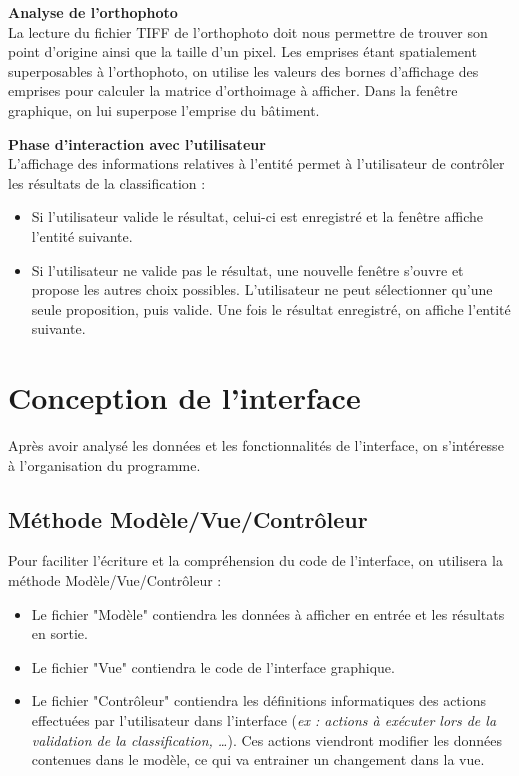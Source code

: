 \noindent\textbf{Analyse de l'orthophoto}\\

La lecture du fichier TIFF de l’orthophoto doit nous permettre de trouver son point d’origine ainsi que la taille d’un pixel. Les emprises étant spatialement superposables à l’orthophoto, on utilise les valeurs des bornes d’affichage des emprises pour calculer la matrice d’orthoimage à afficher. Dans la fenêtre graphique, on lui superpose l’emprise du bâtiment.\newline

\noindent\textbf{Phase d'interaction avec l'utilisateur}\\

L’affichage des informations relatives à l’entité permet à l’utilisateur de contrôler les résultats de la classification :
\begin{itemize}[label=$\rightarrow$]
	\item Si l’utilisateur valide le résultat, celui-ci est enregistré et la fenêtre affiche l’entité suivante.
	\item Si l’utilisateur ne valide pas le résultat, une nouvelle fenêtre s’ouvre et propose les autres choix possibles. L’utilisateur ne peut sélectionner qu’une seule proposition, puis valide. Une fois le résultat enregistré, on affiche l’entité suivante.
\end{itemize}

\section{Conception de l'interface}

Après avoir analysé les données et les fonctionnalités de l'interface, on s'intéresse à l'organisation du programme.

\subsection{Méthode Modèle/Vue/Contrôleur}

Pour faciliter l’écriture et la compréhension du code de l’interface, on utilisera la méthode Modèle/Vue/Contrôleur :

\begin{itemize}[label=$\rightarrow$]
	\item Le fichier "Modèle" contiendra les données à afficher en entrée et les résultats en sortie.
	\item Le fichier "Vue" contiendra le code de l’interface graphique.
	\item Le fichier "Contrôleur" contiendra les définitions informatiques des actions effectuées par l’utilisateur dans l’interface (\emph{ex : actions à exécuter lors de la validation de la classification, …}). Ces actions viendront modifier les données contenues dans le modèle, ce qui va entrainer un changement dans la vue.
\end{itemize}

